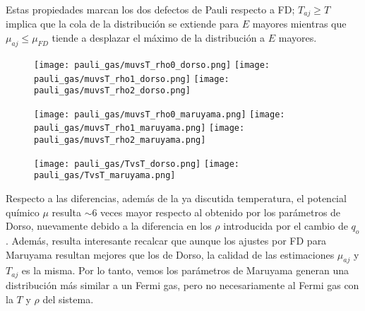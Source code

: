 Estas propiedades marcan los dos defectos de Pauli respecto a FD; $T_{aj}\geq T$ implica que la cola de la distribución se extiende para $E$ mayores mientras que $\mu_{aj}\leq\mu_{FD}$ tiende a
desplazar el máximo de la distribución a $E$ mayores.

\begin{figure}[H]
	\centering
	\texttt{[image: pauli\_gas/muvsT\_rho0\_dorso.png]}
	\texttt{[image: pauli\_gas/muvsT\_rho1\_dorso.png]}
	\texttt{[image: pauli\_gas/muvsT\_rho2\_dorso.png]}
	\caption{}
	\label{fig:muvsT_dorso}
\end{figure}
\begin{figure}[H]
	\centering
	\texttt{[image: pauli\_gas/muvsT\_rho0\_maruyama.png]}
	\texttt{[image: pauli\_gas/muvsT\_rho1\_maruyama.png]}
	\texttt{[image: pauli\_gas/muvsT\_rho2\_maruyama.png]}
	\caption{}
	\label{fig:muvsT_maruyama}
\end{figure}
\begin{figure}[H]
	\centering
	\texttt{[image: pauli\_gas/TvsT\_dorso.png]}
	\texttt{[image: pauli\_gas/TvsT\_maruyama.png]}
	\caption{}
	\label{fig:TvsT_dorso}
\end{figure}

Respecto a las diferencias, además de la ya discutida temperatura, el potencial químico $\mu$ resulta $\sim 6$ veces mayor respecto al obtenido por los parámetros de Dorso, nuevamente 
debido a la diferencia en los $\rho$ introducida por el cambio de $q_o$.
Además, resulta interesante recalcar que aunque los ajustes por FD para Maruyama resultan mejores que los de Dorso, la calidad de las estimaciones $\mu_{aj}$ y $T_{aj}$ es la misma.
Por lo tanto, vemos los parámetros de Maruyama generan una distribución más similar a un Fermi gas, pero no necesariamente al Fermi gas con la $T$ y $\rho$ del sistema.


